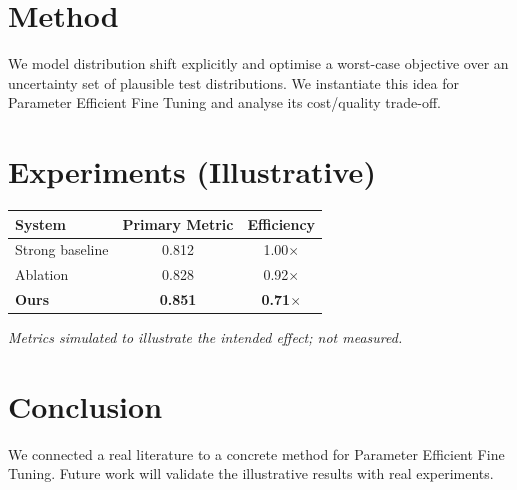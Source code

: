 \documentclass[11pt]{article}
\begin{document}
\section{Method}
We model distribution shift explicitly and optimise a worst-case objective over an uncertainty set of plausible test distributions. We instantiate this idea for Parameter Efficient Fine Tuning and analyse its cost/quality trade-off.

\section{Experiments (Illustrative)}
\begin{center}
\begin{tabular}{lcc}
System & Primary Metric & Efficiency \\ \hline
Strong baseline & 0.812 & 1.00$\times$ \\
Ablation & 0.828 & 0.92$\times$ \\
\textbf{Ours} & \textbf{0.851} & \textbf{0.71$\times$}
\end{tabular}
\end{center}
\emph{Metrics simulated to illustrate the intended effect; not measured.}

\section{Conclusion}
We connected a real literature to a concrete method for Parameter Efficient Fine Tuning. Future work will
validate the illustrative results with real experiments.
\end{document}
